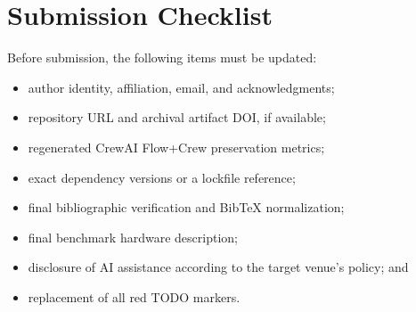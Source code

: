 \documentclass[10pt]{article}
\begin{document}
\section{Submission Checklist}

Before submission, the following items must be updated:

\begin{itemize}[leftmargin=*]
  \item author identity, affiliation, email, and acknowledgments;
  \item repository URL and archival artifact DOI, if available;
  \item regenerated CrewAI Flow+Crew preservation metrics;
  \item exact dependency versions or a lockfile reference;
  \item final bibliographic verification and BibTeX normalization;
  \item final benchmark hardware description;
  \item disclosure of AI assistance according to the target venue's policy; and
  \item replacement of all red TODO markers.
\end{itemize}
\end{document}
